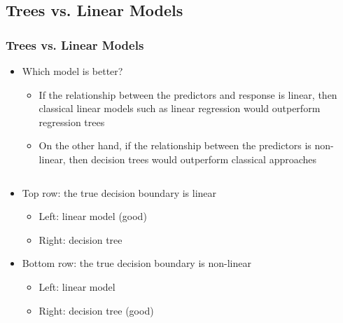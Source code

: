 \documentclass[
  shownotes,
  xcolor={svgnames},
  hyperref={colorlinks,citecolor=DarkBlue,linkcolor=DarkRed,urlcolor=DarkBlue}
  ]{beamer}
\begin{document}
\subsection{Trees vs. Linear Models}
\begin{frame}[fragile]
\frametitle{Trees vs. Linear Models}
\begin{itemize}
\item Which model is better?

\begin{itemize}
  \item If the relationship between the predictors and response is linear, then classical linear models such as linear regression would outperform regression trees
  \item On the other hand, if the relationship between the predictors is non-linear, then decision trees would outperform classical approaches
\end{itemize}
\end{itemize}


\begin{columns}[T] %
\begin{column}{.42\textwidth}
\scriptsize
\begin{itemize}  
\item Top row: the true decision boundary is linear
  \begin{itemize}
    \scriptsize
    \item Left: linear model (good)
    \item Right: decision tree 
  \end{itemize}

\item Bottom row: the true decision boundary is non-linear
  \begin{itemize}
    \scriptsize
    \item Left: linear model 
    \item Right: decision tree (good)
  \end{itemize}

\end{itemize}


\end{column}  
\hfill
\begin{column}{.48\textwidth}


\end{column}
\end{columns}
\end{frame}
\end{document}
